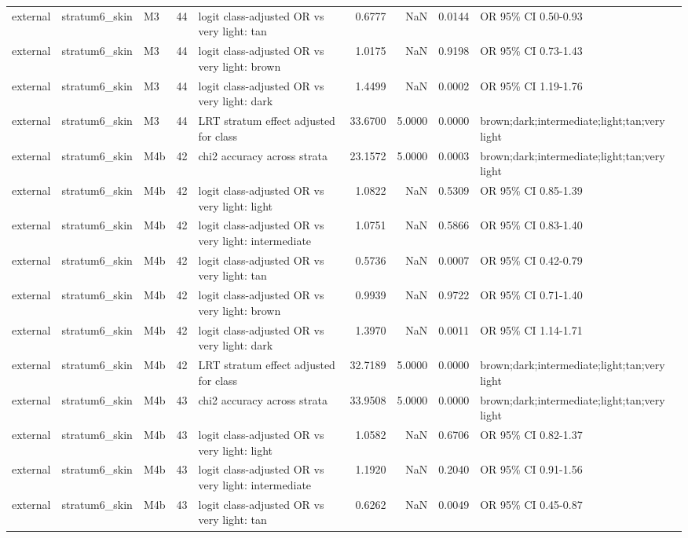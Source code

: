 \begin{tabular}{lllrlrrrl}
external & stratum6\_skin & M3 & 44 & logit class-adjusted OR vs very light: tan & 0.6777 & NaN & 0.0144 & OR 95\% CI 0.50-0.93 \\
external & stratum6\_skin & M3 & 44 & logit class-adjusted OR vs very light: brown & 1.0175 & NaN & 0.9198 & OR 95\% CI 0.73-1.43 \\
external & stratum6\_skin & M3 & 44 & logit class-adjusted OR vs very light: dark & 1.4499 & NaN & 0.0002 & OR 95\% CI 1.19-1.76 \\
external & stratum6\_skin & M3 & 44 & LRT stratum effect adjusted for class & 33.6700 & 5.0000 & 0.0000 & brown;dark;intermediate;light;tan;very light \\
external & stratum6\_skin & M4b & 42 & chi2 accuracy across strata & 23.1572 & 5.0000 & 0.0003 & brown;dark;intermediate;light;tan;very light \\
external & stratum6\_skin & M4b & 42 & logit class-adjusted OR vs very light: light & 1.0822 & NaN & 0.5309 & OR 95\% CI 0.85-1.39 \\
external & stratum6\_skin & M4b & 42 & logit class-adjusted OR vs very light: intermediate & 1.0751 & NaN & 0.5866 & OR 95\% CI 0.83-1.40 \\
external & stratum6\_skin & M4b & 42 & logit class-adjusted OR vs very light: tan & 0.5736 & NaN & 0.0007 & OR 95\% CI 0.42-0.79 \\
external & stratum6\_skin & M4b & 42 & logit class-adjusted OR vs very light: brown & 0.9939 & NaN & 0.9722 & OR 95\% CI 0.71-1.40 \\
external & stratum6\_skin & M4b & 42 & logit class-adjusted OR vs very light: dark & 1.3970 & NaN & 0.0011 & OR 95\% CI 1.14-1.71 \\
external & stratum6\_skin & M4b & 42 & LRT stratum effect adjusted for class & 32.7189 & 5.0000 & 0.0000 & brown;dark;intermediate;light;tan;very light \\
external & stratum6\_skin & M4b & 43 & chi2 accuracy across strata & 33.9508 & 5.0000 & 0.0000 & brown;dark;intermediate;light;tan;very light \\
external & stratum6\_skin & M4b & 43 & logit class-adjusted OR vs very light: light & 1.0582 & NaN & 0.6706 & OR 95\% CI 0.82-1.37 \\
external & stratum6\_skin & M4b & 43 & logit class-adjusted OR vs very light: intermediate & 1.1920 & NaN & 0.2040 & OR 95\% CI 0.91-1.56 \\
external & stratum6\_skin & M4b & 43 & logit class-adjusted OR vs very light: tan & 0.6262 & NaN & 0.0049 & OR 95\% CI 0.45-0.87 \\

\end{tabular}
